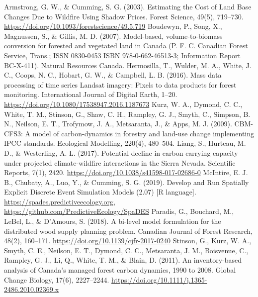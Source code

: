 \documentclass[
]{article}
\begin{document}
Armstrong, G. W., \& Cumming, S. G. (2003). Estimating the Cost of Land
Base Changes Due to Wildfire Using Shadow Prices. Forest Science, 49(5),
719--730. \url{https://doi.org/10.1093/forestscience/49.5.719} Boudewyn,
P., Song, X., Magnussen, S., \& Gillis, M. D. (2007). Model-based,
volume-to-biomass conversion for forested and vegetated land in Canada
(P. F. C. Canadian Forest Service, Trans.; ISSN 0830-0453 ISBN
978-0-662-46513-3; Information Report BC-X-411). Natural Resources
Canada. Hermosilla, T., Wulder, M. A., White, J. C., Coops, N. C.,
Hobart, G. W., \& Campbell, L. B. (2016). Mass data processing of time
series Landsat imagery: Pixels to data products for forest monitoring.
International Journal of Digital Earth, 1--20.
\url{https://doi.org/10.1080/17538947.2016.1187673} Kurz, W. A., Dymond,
C. C., White, T. M., Stinson, G., Shaw, C. H., Rampley, G. J., Smyth,
C., Simpson, B. N., Neilson, E. T., Trofymow, J. A., Metsaranta, J., \&
Apps, M. J. (2009). CBM-CFS3: A model of carbon-dynamics in forestry and
land-use change implementing IPCC standards. Ecological Modelling,
220(4), 480--504. Liang, S., Hurteau, M. D., \& Westerling, A. L.
(2017). Potential decline in carbon carrying capacity under projected
climate-wildfire interactions in the Sierra Nevada. Scientific Reports,
7(1), 2420. \url{https://doi.org/10.1038/s41598-017-02686-0} McIntire,
E. J. B., Chubaty, A., Luo, Y., \& Cumming, S. G. (2019). Develop and
Run Spatially Explicit Discrete Event Simulation Models (2.07) {[}R
language{]}. \url{https://spades.predictiveecology.org},
\url{https://github.com/PredictiveEcology/SpaDES} Paradis, G., Bouchard,
M., LeBel, L., \& D'Amours, S. (2018). A bi-level model formulation for
the distributed wood supply planning problem. Canadian Journal of Forest
Research, 48(2), 160--171. \url{https://doi.org/10.1139/cjfr-2017-0240}
Stinson, G., Kurz, W. A., Smyth, C. E., Neilson, E. T., Dymond, C. C.,
Metsaranta, J. M., Boisvenue, C., Rampley, G. J., Li, Q., White, T. M.,
\& Blain, D. (2011). An inventory-based analysis of Canada's managed
forest carbon dynamics, 1990 to 2008. Global Change Biology, 17(6),
2227--2244. \url{https://doi.org/10.1111/j.1365-2486.2010.02369.x}
\end{document}
